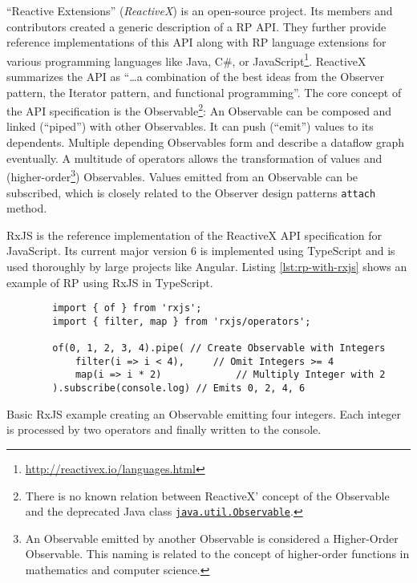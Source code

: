 \documentclass[12pt,a4paper]{article}
\begin{document}
``Reactive Extensions'' (\emph{ReactiveX}) is an open-source project. Its members and contributors created a generic description of a RP API. They further provide reference implementations of this API along with RP language extensions for various programming languages like Java, C\#, or JavaScript\footnote{\url{http://reactivex.io/languages.html}}. ReactiveX summarizes the API as ``\dots a combination of the best ideas from the Observer pattern, the Iterator pattern, and functional programming''\cite{reactivex}. The core concept of the API specification is the Observable\footnote{There is no known relation between ReactiveX' concept of the Observable and the deprecated Java class \href{https://docs.oracle.com/en/java/javase/11/docs/api/java.base/java/util/Observable.html}{\texttt{java.util.Observable}}.}: An Observable can be composed and linked (``piped'') with other Observables. It can push (``emit'') values to its dependents. Multiple depending Observables form and describe a dataflow graph eventually. A multitude of operators allows the transformation of values and (higher-order\footnote{An Observable emitted by another Observable is considered a Higher-Order Observable. This naming is related to the concept of higher-order functions in mathematics and computer science.}) Observables. Values emitted from an Observable can be subscribed, which is closely related to the Observer design patterns \texttt{attach} method.

RxJS\cite{rxjs} is the reference implementation of the ReactiveX API specification for JavaScript. Its current major version 6 is implemented using TypeScript and is used thoroughly by large projects like Angular\cite{angualrrxjs}. Listing \ref{lst:rp-with-rxjs} shows an example of RP using RxJS in TypeScript.

\begin{listing}[H]
	\begin{verbatim}
		import { of } from 'rxjs';
		import { filter, map } from 'rxjs/operators';

		of(0, 1, 2, 3, 4).pipe(	// Create Observable with Integers
			filter(i => i < 4),		// Omit Integers >= 4
			map(i => i * 2)				// Multiply Integer with 2
		).subscribe(console.log) // Emits 0, 2, 4, 6
	\end{verbatim}
	\caption{Basic RxJS example creating an Observable emitting four integers. Each integer is processed by two operators and finally written to the console.}
	\label{lst:rp-with-rxjs}
\end{listing}
\end{document}
